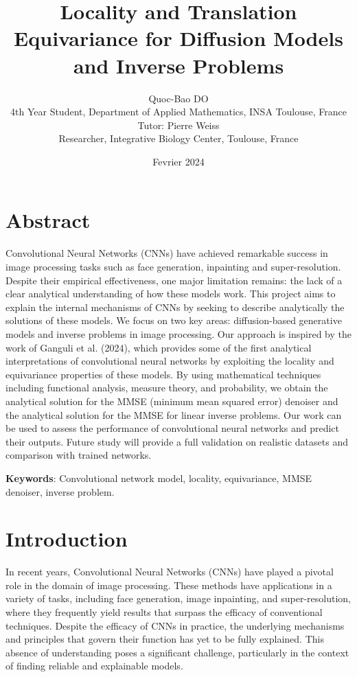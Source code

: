 \documentclass[a4paper,10pt]{article}
\title{Locality and Translation Equivariance for Diffusion Models and Inverse Problems}
\author{Quoc-Bao DO \\
4th Year Student, Department of Applied Mathematics, INSA Toulouse, France \\
Tutor: Pierre Weiss \\
Researcher, Integrative Biology Center, Toulouse, France}
\date{Fevrier 2024}
\theoremstyle{definition} %
\theoremstyle{definition} %
\theoremstyle{definition} %
\theoremstyle{definition} %
\newcommand{\0}{\boldsymbol{0}}
\begin{document}
\maketitle


\newpage
\tableofcontents
\newpage

\section*{Abstract}
Convolutional Neural Networks (CNNs) have achieved remarkable success in image processing tasks such as face generation, inpainting and super-resolution. Despite their empirical effectiveness, one major limitation remains: the lack of a clear analytical understanding of how these models work. This project aims to explain the internal mechanisms of CNNs by seeking to describe analytically the solutions of these models. We focus on two key areas: diffusion-based generative models and inverse problems in image processing. Our approach is inspired by the work of Ganguli et al. (2024), which provides some of the first analytical interpretations of convolutional neural networks by exploiting the locality and equivariance properties of these models. By using mathematical techniques including functional analysis, measure theory, and probability, we obtain the analytical solution for the MMSE (minimum mean squared error) denoiser and the analytical solution for the MMSE for linear inverse problems. Our work can be used to assess the performance of convolutional neural networks and predict their outputs. Future study will provide a full validation on realistic datasets and comparison with trained networks.

\textbf{Keywords}: Convolutional network model, locality, equivariance, MMSE denoiser, inverse problem.

\section{Introduction}

In recent years, Convolutional Neural Networks (CNNs) have played a pivotal role in the domain of image processing. These methods have applications in a variety of tasks, including face generation, image inpainting, and super-resolution, where they frequently yield results that surpass the efficacy of conventional techniques. Despite the efficacy of CNNs in practice, the underlying mechanisms and principles that govern their function has yet to be fully explained. This absence of understanding poses a significant challenge, particularly in the context of finding reliable and explainable models.
\end{document}
